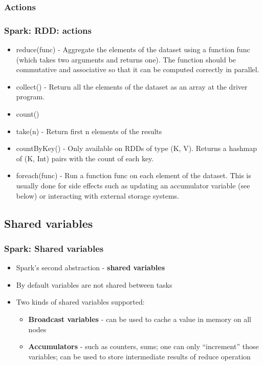 \documentclass{beamer}
\begin{document}
\subsubsection{Actions}
\begin{frame}
  \frametitle{Spark: RDD: actions}
  \begin{itemize}
  \item {\color{mycolorcode}reduce(func)} - Aggregate the elements of the dataset using a function func (which takes two arguments and returns one). The function should be commutative and associative so that it can be computed correctly in parallel.
  \item {\color{mycolorcode}collect()} - Return all the elements of the dataset as an array at the driver program.
  \item {\color{mycolorcode}count()}
  \item {\color{mycolorcode}take(n)} - Return first n elements of the results
  \item {\color{mycolorcode}countByKey()} - Only available on RDDs of type (K, V). Returns a hashmap of (K, Int) pairs with the count of each key.
  \item {\color{mycolorcode}foreach(func)} - Run a function func on each element of the dataset. This is usually done for side effects such as updating an accumulator variable (see below) or interacting with external storage systems.
  \end{itemize}
\end{frame}

\subsection{Shared variables}
\begin{frame}
  \frametitle{Spark: Shared variables}
  \begin{itemize}
   \item Spark's second abstraction - {\color{mycolordef}\textbf{shared variables}}
   \item By default variables are not shared between tasks
   \item Two kinds of shared variables supported:
    \begin{itemize}
      \item {\color{mycolordef}\textbf{Broadcast variables}} - can be used to cache a value in memory on all nodes
      \item {\color{mycolordef}\textbf{Accumulators}} - such as counters, sums; one can only ``increment'' those variables; can be used to store intermediate results of reduce operation
    \end{itemize}	
  \end{itemize} 
\end{frame}
\end{document}
